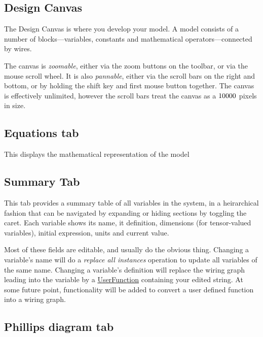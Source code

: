 \subsection{Design Canvas}
\label{DesignCanvas}\label{tabs:Wiring}

The Design Canvas is where you develop your model. A model consists of
a number of blocks---variables, constants and mathematical
operators---connected by wires. 

The canvas is {\em zoomable}, either via the zoom buttons on the toolbar, or
via the mouse scroll wheel. It is also {\em pannable}, either via the
scroll bars on the right and bottom, or by holding the shift key and
first mouse button together. The canvas is effectively unlimited,
however the scroll bars treat the canvas as a $10000\time10000$ pixels
in size.


\subsection{Equations tab}\label{tabs:Equations}

This displays the mathematical representation of the model

\subsection{Summary Tab}\label{tabs:Summary}

This tab provides a summary table of all variables in the system, in a
heirarchical fashion that can be navigated by expanding or hiding
sections by toggling the caret. Each variable shows its name, it
definition, dimensions (for tensor-valued variables), initial
expression, units and current value.

Most of these fields are editable, and usually do the obvious
thing. Changing a variable's name will do a {\em replace all
  instances} operation to update all variables of the same
name. Changing a variable's definition will replace the wiring graph
leading into the variable by a \hyperref{user defined function}{user
  defined function (\S}{)}{UserFunction} containing your
edited string. At some future point, functionality will be added to
convert a user defined function into a wiring graph.

\subsection{Phillips diagram tab}\label{tabs:Phillips}

